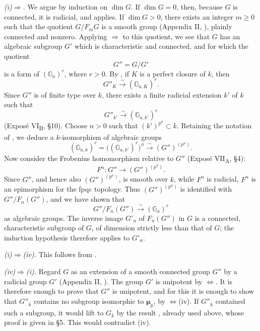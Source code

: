 \medskip\noindent
\textit{(i)\(\Rightarrow\).}\quad
We argue by induction on \(\dim G\).  If \(\dim G=0\), then,
because \(G\) is connected, it is radicial, and  applies.
If \(\dim G>0\), there exists an integer \(m\geq0\) such that the
quotient \(G/F_mG\) is a smooth group (Appendix II, ), plainly
connected and nonzero.  Applying
\(\Rightarrow\) to this quotient, we see that \(G\)
has an algebraic subgroup \(G'\) which is characteristic and
connected, and for which the quotient
\[
  G''=G/G'
\]
is a form of \((\mathbb G_a)^r\), where \(r>0\).  By , if
\(K\) is a perfect closure of \(k\), then
\[
  G''_K\xrightarrow{\sim}(\mathbb G_{a,K})^r.
\]
Since \(G''\) is of finite type over \(k\), there exists a finite
radicial extension \(k'\) of \(k\) such that
\[
  G''_{k'}\xrightarrow{\sim}(\mathbb G_{a,k'})^r
\]
(Exposé VI\textsubscript{B}, \S10).  Choose \(n>0\) such that
\((k')^{p^n}\subset k\).  Retaining the notation of , we
deduce a \(k\)-isomorphism of algebraic groups
\[
  (\mathbb G_{a,k})^r
   =\bigl((\mathbb G_{a,k'})^r\bigr)^\phi
   \xrightarrow{\sim}(G'')^{(p^n)}.
\]
Now consider the Frobenius homomorphism relative to \(G''\)
(Exposé VII\textsubscript{A}, \S4):
\[
  F^n:G''\longrightarrow(G'')^{(p^n)}.
\]
Since \(G''\), and hence also \((G'')^{(p^n)}\), is smooth over
\(k\), while \(F^n\) is radicial, \(F^n\) is an epimorphism for
the fpqc topology.  Thus \((G'')^{(p^n)}\) is identified with
\(G''/F_n(G'')\), and we have shown that
\[
  G''/F_n(G'')\xrightarrow{\sim}(\mathbb G_a)^r
\]
as algebraic groups.  The inverse image \(G'_n\) of \(F_n(G'')\)
in \(G\) is a connected, characteristic subgroup of \(G\), of
dimension strictly less than that of \(G\); the induction
hypothesis therefore applies to \(G'_n\).

\medskip\noindent
\textit{(i)\(\Rightarrow\)(iv).}\quad
This follows from .

\medskip\noindent
\textit{(iv)\(\Rightarrow\)(i).}\quad
Regard \(G\) as an extension of a smooth connected group \(G''\)
by a radicial group \(G'\) (Appendix II, ).  The group \(G'\)
is unipotent by \(\Leftrightarrow\).  It is therefore
enough to prove that \(G''\) is unipotent, and for this it is
enough to show that \(G''_{\overline{k}}\) contains no subgroup
isomorphic to \(\boldsymbol\mu_p\), by
\(\Leftrightarrow\)(iv).  If
\(G''_{\overline{k}}\) contained such a subgroup, it would lift
to \(G_{\overline{k}}\) by the result , already used above,
whose proof is given in \S5.  This would contradict (iv).


